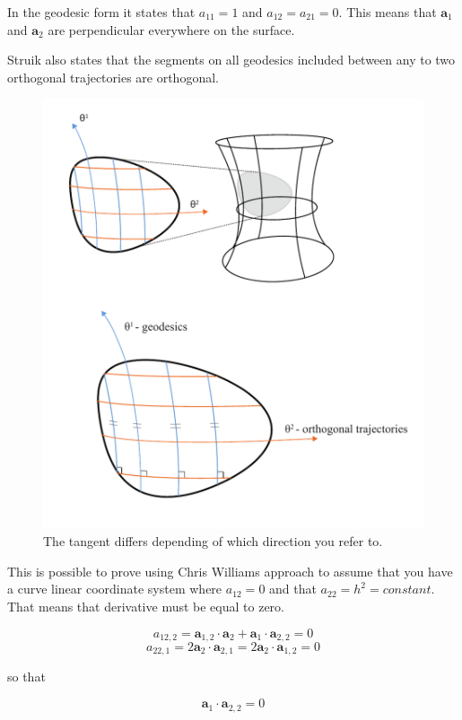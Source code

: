 In the geodesic form it states that $a_{11} = 1$ and $a_{12}=a_{21} = 0$. This means that $\textbf{a}_1$ and $\textbf{a}_2$ are perpendicular everywhere on the surface. 

Struik also states that the segments  on all geodesics included  between any to two orthogonal  trajectories are orthogonal.


\begin{figure}[H]
\centering
\includegraphics[height=0.8\linewidth ]{figure/Theory/SurfGeodesics.pdf}
\caption{The tangent differs depending of which direction you refer to. }
\end{figure}

This is possible to prove using Chris Williams approach to assume that you have a curve linear coordinate system where $a_{12} = 0$ and that $a_{22} = h^2 = constant$. That means that derivative must be equal to zero.

\begin{equation}
a_{12,2} = \textbf{a}_{1,2} \cdot \textbf{a}_2 + \textbf{a}_1 \cdot \textbf{a}_{2,2} = 0
\end{equation}
\begin{equation}
a_{22,1} = 2\textbf{a}_{2} \cdot \textbf{a}_{2,1} = 2\textbf{a}_{2} \cdot \textbf{a}_{1,2} = 0
\end{equation}

so that

\begin{equation}
\textbf{a}_1 \cdot \textbf{a}_{2,2} = 0
\end{equation}

